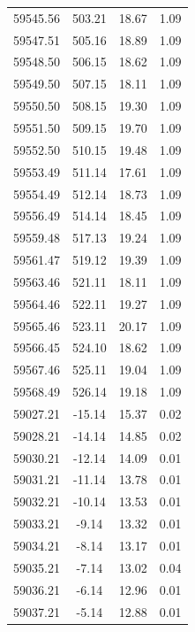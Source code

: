 \begin{longtable}{|c|c|c|c|}
 59545.56 &  503.21 &       18.67 &          1.09 \\
 59547.51 &  505.16 &       18.89 &          1.09 \\
 59548.50 &  506.15 &       18.62 &          1.09 \\
 59549.50 &  507.15 &       18.11 &          1.09 \\
 59550.50 &  508.15 &       19.30 &          1.09 \\
 59551.50 &  509.15 &       19.70 &          1.09 \\
 59552.50 &  510.15 &       19.48 &          1.09 \\
 59553.49 &  511.14 &       17.61 &          1.09 \\
 59554.49 &  512.14 &       18.73 &          1.09 \\
 59556.49 &  514.14 &       18.45 &          1.09 \\
 59559.48 &  517.13 &       19.24 &          1.09 \\
 59561.47 &  519.12 &       19.39 &          1.09 \\
 59563.46 &  521.11 &       18.11 &          1.09 \\
 59564.46 &  522.11 &       19.27 &          1.09 \\
 59565.46 &  523.11 &       20.17 &          1.09 \\
 59566.45 &  524.10 &       18.62 &          1.09 \\
 59567.46 &  525.11 &       19.04 &          1.09 \\
 59568.49 &  526.14 &       19.18 &          1.09 \\
 59027.21 &  -15.14 &       15.37 &          0.02 \\
 59028.21 &  -14.14 &       14.85 &          0.02 \\
 59030.21 &  -12.14 &       14.09 &          0.01 \\
 59031.21 &  -11.14 &       13.78 &          0.01 \\
 59032.21 &  -10.14 &       13.53 &          0.01 \\
 59033.21 &   -9.14 &       13.32 &          0.01 \\
 59034.21 &   -8.14 &       13.17 &          0.01 \\
 59035.21 &   -7.14 &       13.02 &          0.04 \\
 59036.21 &   -6.14 &       12.96 &          0.01 \\
 59037.21 &   -5.14 &       12.88 &          0.01 \\

\end{longtable}
